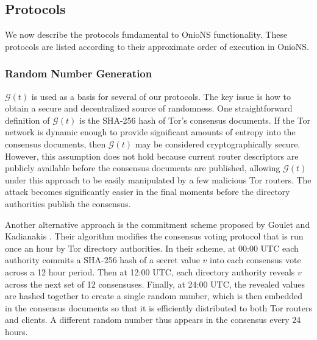 \documentclass[USenglish,oneside,twocolumn]{article}
\begin{document}


\subsection{Protocols}
\label{sec:protocols}

We now describe the protocols fundamental to OnioNS functionality. These protocols are listed according to their approximate order of execution in OnioNS.

\subsubsection{Random Number Generation}
\label{sec:rngProcess}

$ \mathcal{G}(t) $ is used as a basis for several of our protocols. The key issue is how to obtain a secure and decentralized source of randomness.  One straightforward definition of $ \mathcal{G}(t) $ is the SHA-256 hash of Tor's consensus documents. If the Tor network is dynamic enough to provide significant amounts of entropy into the consensus documents, then $ \mathcal{G}(t) $ may be considered cryptographically secure. However, this assumption does not hold because current router descriptors are publicly available before the consensus documents are published, allowing $ \mathcal{G}(t) $ under this approach to be easily manipulated by a few malicious Tor routers. The attack becomes significantly easier in the final moments before the directory authorities publish the consensus.

Another alternative approach is the commitment scheme proposed by Goulet and Kadianakis \cite{GouletCommitReveal}. Their algorithm modifies the consensus voting protocol that is run once an hour by Tor directory authorities. In their scheme, at 00:00 UTC each authority commits a SHA-256 hash of a secret value $ v $ into each consensus vote across a 12 hour period. Then at 12:00 UTC, each directory authority reveals $ v $ across the next set of 12 consensuses. Finally, at 24:00 UTC, the revealed values are hashed together to create a single random number, which is then embedded in the consensus documents so that it is efficiently distributed to both Tor routers and clients. A different random number thus appears in the consensus every 24 hours. 
\end{document}
